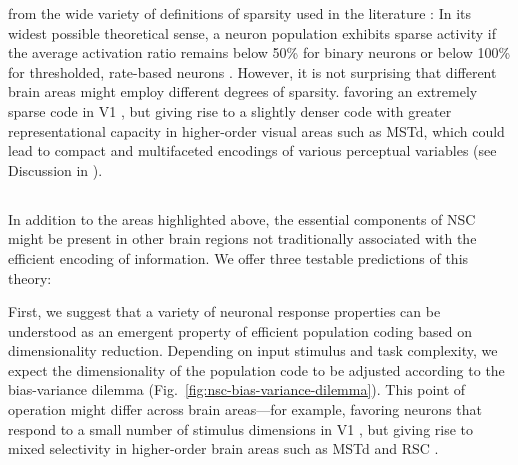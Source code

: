  from the wide variety of definitions of sparsity
used in the literature \cite{SpanneJorntell2015,BarthPoulet2012}:
In its widest possible theoretical sense,
a neuron population exhibits sparse activity if the average activation ratio
remains below 50\% for binary neurons 
or below 100\% for thresholded,
rate-based neurons \cite{SpanneJorntell2015}.
However, it is not surprising that different brain areas might employ
different degrees of sparsity.
favoring an extremely sparse code in \ac{V1}
\cite{OlshausenField1996},
but giving rise to a slightly denser code with 
greater representational capacity in higher-order visual areas
such as \ac{MSTd}, 
which could lead to compact and multifaceted encodings
of various perceptual variables
(see Discussion in \cite{Beyeler2016}).



\subsection*{}

In addition to the areas highlighted above, 
the essential components of \ac{NSC} might be present 
in other brain regions not traditionally associated 
with the efficient encoding of information.
We offer three testable predictions of this theory:

First, we suggest that a variety of neuronal response properties
can be understood as an emergent property of efficient population coding 
based on dimensionality reduction.
Depending on input stimulus and task complexity,
we expect the dimensionality of the population code to be adjusted
according to the bias-variance dilemma
(Fig.~\ref{fig:nsc-bias-variance-dilemma}).
This point of operation might differ across brain areas---for example,
favoring neurons that respond to a small number of stimulus dimensions
in \ac{V1} \cite{OlshausenField1996},
but giving rise to mixed selectivity in higher-order brain areas
such as \ac{MSTd} \cite{Beyeler2016} and
\ac{RSC} \cite{Rounds2016,Rounds2018}.

